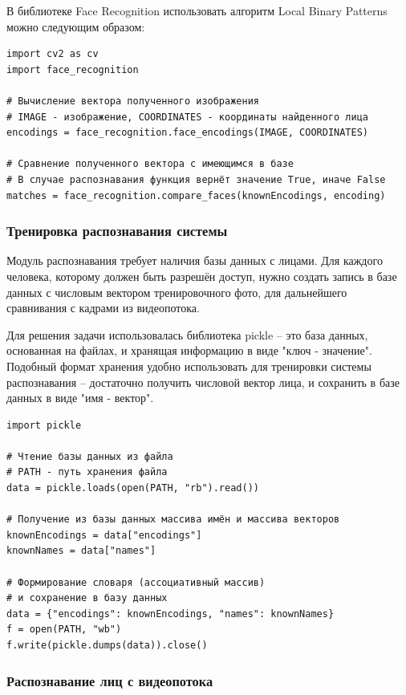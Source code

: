 В библиотеке Face Recognition использовать алгоритм Local Binary Patterns можно следующим
образом:

\begin{lstlisting}
import cv2 as cv
import face_recognition

# Вычисление вектора полученного изображения
# IMAGE - изображение, COORDINATES - координаты найденного лица
encodings = face_recognition.face_encodings(IMAGE, COORDINATES)

# Сравнение полученного вектора с имеющимся в базе
# В случае распознавания функция вернёт значение True, иначе False
matches = face_recognition.compare_faces(knownEncodings, encoding)
\end{lstlisting}

\subsubsection{Тренировка распознавания системы}

Модуль распознавания требует наличия базы данных с лицами. Для каждого
человека, которому должен быть разрешён доступ, нужно создать запись в базе
данных с числовым вектором тренировочного фото, для дальнейшего сравнивания
с кадрами из видеопотока. 

Для решения задачи использовалась библиотека pickle -- это база данных,
основанная на файлах, и хранящая информацию в виде "ключ - значение". Подобный
формат хранения удобно использовать для тренировки системы распознавания --
достаточно получить числовой вектор лица, и сохранить в базе данных в виде "имя
- вектор". 

\begin{lstlisting}
import pickle

# Чтение базы данных из файла
# PATH - путь хранения файла
data = pickle.loads(open(PATH, "rb").read())

# Получение из базы данных массива имён и массива векторов
knownEncodings = data["encodings"]
knownNames = data["names"]

# Формирование словаря (ассоциативный массив)
# и сохранение в базу данных
data = {"encodings": knownEncodings, "names": knownNames}
f = open(PATH, "wb")
f.write(pickle.dumps(data)).close()
\end{lstlisting}

\subsubsection{Распознавание лиц с видеопотока}

